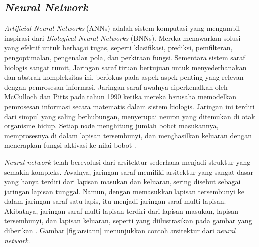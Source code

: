 \subsection{\emph{Neural Network}}
\label{subsec:cnn}

\emph{Artificial Neural Networks} (ANNs) adalah sistem komputasi yang mengambil inspirasi dari \emph{Biological Neural Networks} (BNNs). Mereka menawarkan solusi yang efektif untuk berbagai tugas, seperti klasifikasi, prediksi, pemfilteran, pengoptimalan, pengenalan pola, dan perkiraan fungsi. Sementara sistem saraf biologis sangat rumit, Jaringan saraf tiruan bertujuan untuk menyederhanakan dan abstrak kompleksitas ini, berfokus pada aspek-aspek penting yang relevan dengan pemrosesan informasi. Jaringan saraf awalnya diperkenalkan oleh McCulloch dan Pitts pada tahun 1990 ketika mereka berusaha memodelkan pemrosesan informasi secara matematis dalam sistem biologis. Jaringan ini terdiri dari simpul yang saling berhubungan, menyerupai neuron yang ditemukan di otak organisme hidup. Setiap node menghitung jumlah bobot masukannya, memprosesnya di dalam lapisan tersembunyi, dan menghasilkan keluaran dengan menerapkan fungsi aktivasi ke nilai bobot \parencite{Thakur}.

\emph{Neural network} telah berevolusi dari arsitektur sederhana menjadi struktur yang semakin kompleks. Awalnya, jaringan saraf memiliki arsitektur yang sangat dasar yang hanya terdiri dari lapisan masukan dan keluaran, sering disebut sebagai jaringan lapisan tunggal. Namun, dengan memasukkan lapisan tersembunyi ke dalam jaringan saraf satu lapis, itu menjadi jaringan saraf multi-lapisan. Akibatnya, jaringan saraf multi-lapisan terdiri dari lapisan masukan, lapisan tersembunyi, dan lapisan keluaran, seperti yang diilustrasikan pada gambar yang diberikan \parencite{Thakur}. Gambar \ref{fig:arsiann} menunjukkan contoh arsitektur dari \emph{neural network}.

